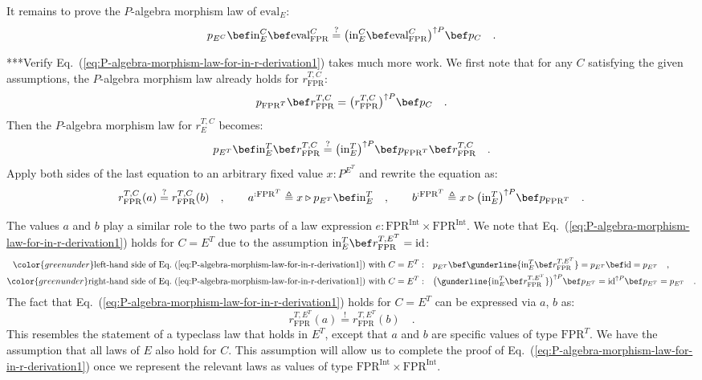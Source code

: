 It remains to prove the $P$-algebra morphism law of $\text{eval}_{E}$:
\begin{align}
p_{E^{C}}\bef\text{in}_{E}^{C}\bef\text{eval}_{\text{FPR}}^{C}\overset{?}{=}\big(\text{in}_{E}^{C}\bef\text{eval}_{\text{FPR}}^{C}\big)^{\uparrow P}\bef p_{C}\quad.\label{eq:P-algebra-morphism-law-for-in-r-derivation1}
\end{align}

{*}{*}{*}Verify Eq.~(\ref{eq:P-algebra-morphism-law-for-in-r-derivation1})
takes much more work. We first note that for any $C$ satisfying the
given assumptions, the $P$-algebra morphism law already holds for
$r_{\text{FPR}}^{T,C}$:
\[
p_{\text{FPR}^{T}}\bef r_{\text{FPR}}^{T,C}=\big(r_{\text{FPR}}^{T,C}\big)^{\uparrow P}\bef p_{C}\quad.
\]
Then the $P$-algebra morphism law for $r_{E}^{T,C}$ becomes:
\[
p_{E^{T}}\bef\text{in}_{E}^{T}\bef r_{\text{FPR}}^{T,C}\overset{?}{=}\big(\text{in}_{E}^{T}\big)^{\uparrow P}\bef p_{\text{FPR}^{T}}\bef r_{\text{FPR}}^{T,C}\quad.
\]
Apply both sides of the last equation to an arbitrary fixed value
$x:P^{E^{T}}$ and rewrite the equation as: 
\[
r_{\text{FPR}}^{T,C}(a)\overset{?}{=}r_{\text{FPR}}^{T,C}(b)\quad,\quad\quad a^{:\text{FPR}^{T}}\triangleq x\triangleright p_{E^{T}}\bef\text{in}_{E}^{T}\quad,\quad\quad b^{:\text{FPR}^{T}}\triangleq x\triangleright\big(\text{in}_{E}^{T}\big)^{\uparrow P}\bef p_{\text{FPR}^{T}}\quad.
\]

The values $a$ and $b$ play a similar role to the two parts of a
law expression $e:\text{FPR}^{\text{Int}}\times\text{FPR}^{\text{Int}}$.
We note that Eq.~(\ref{eq:P-algebra-morphism-law-for-in-r-derivation1})
holds for $C=E^{T}$ due to the assumption $\text{in}_{E}^{T}\bef r_{\text{FPR}}^{T,E^{T}}=\text{id}$:
\begin{align*}
{\color{greenunder}\text{left-hand side of Eq.~(\ref{eq:P-algebra-morphism-law-for-in-r-derivation1}) with }C=E^{T}:}\quad & p_{E^{T}}\bef\gunderline{\text{in}_{E}^{T}\bef r_{\text{FPR}}^{T,E^{T}}}=p_{E^{T}}\bef\text{id}=p_{E^{T}}\quad,\\
{\color{greenunder}\text{right-hand side of Eq.~(\ref{eq:P-algebra-morphism-law-for-in-r-derivation1}) with }C=E^{T}:}\quad & \big(\gunderline{\text{in}_{E}^{T}\bef r_{\text{FPR}}^{T,E^{T}}}\big)^{\uparrow P}\bef p_{E^{T}}=\text{id}^{\uparrow P}\bef p_{E^{T}}=p_{E^{T}}\quad.
\end{align*}
The fact that Eq.~(\ref{eq:P-algebra-morphism-law-for-in-r-derivation1})
holds for $C=E^{T}$ can be expressed via $a$, $b$ as:
\[
r_{\text{FPR}}^{T,E^{T}}(a)\overset{!}{=}r_{\text{FPR}}^{T,E^{T}}(b)\quad.
\]
This resembles the statement of a typeclass law that holds in $E^{T}$,
except that $a$ and $b$ are specific values of type $\text{FPR}^{T}$.
We have the assumption that all laws of $E$ also hold for $C$. This
assumption will allow us to complete the proof of Eq.~(\ref{eq:P-algebra-morphism-law-for-in-r-derivation1})
once we represent the relevant laws as values of type $\text{FPR}^{\text{Int}}\times\text{FPR}^{\text{Int}}$.

